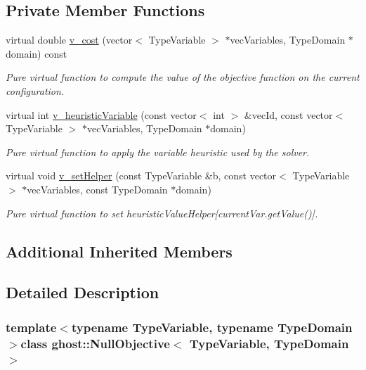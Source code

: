 \subsection*{Private Member Functions}
\begin{DoxyCompactItemize}
\item 
virtual double \hyperlink{classghost_1_1NullObjective_ad0b2d0aa21ecfc4c0fa42c0ada282a30}{v\-\_\-cost} (vector$<$ Type\-Variable $>$ $\ast$vec\-Variables, Type\-Domain $\ast$domain) const 
\begin{DoxyCompactList}\small\item\em Pure virtual function to compute the value of the objective function on the current configuration. \end{DoxyCompactList}\item 
virtual int \hyperlink{classghost_1_1NullObjective_aef7e24c71f2522034764402704e3b16f}{v\-\_\-heuristic\-Variable} (const vector$<$ int $>$ \&vec\-Id, const vector$<$ Type\-Variable $>$ $\ast$vec\-Variables, Type\-Domain $\ast$domain)
\begin{DoxyCompactList}\small\item\em Pure virtual function to apply the variable heuristic used by the solver. \end{DoxyCompactList}\item 
virtual void \hyperlink{classghost_1_1NullObjective_a5f4b22306c25132590e3c10a6dc34d15}{v\-\_\-set\-Helper} (const Type\-Variable \&b, const vector$<$ Type\-Variable $>$ $\ast$vec\-Variables, const Type\-Domain $\ast$domain)
\begin{DoxyCompactList}\small\item\em Pure virtual function to set heuristic\-Value\-Helper\mbox{[}current\-Var.\-get\-Value()\mbox{]}. \end{DoxyCompactList}\end{DoxyCompactItemize}
\subsection*{Additional Inherited Members}


\subsection{Detailed Description}
\subsubsection*{template$<$typename Type\-Variable, typename Type\-Domain$>$class ghost\-::\-Null\-Objective$<$ Type\-Variable, Type\-Domain $>$}

